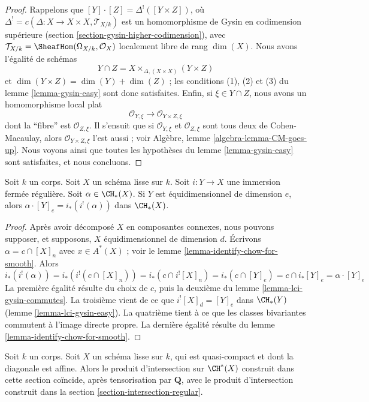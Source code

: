 \begin{proof}
Rappelons que $[Y] \cdot [Z] = \Delta^!([Y \times Z])$, où
$\Delta^! = c(\Delta : X \to X \times X, \mathcal{T}_{X/k})$
est un homomorphisme de Gysin en codimension supérieure
(section \ref{section-gysin-higher-codimension}), avec
$\mathcal{T}_{X/k} = \SheafHom(\Omega_{X/k}, \mathcal{O}_X)$
localement libre de rang $\dim(X)$. Nous avons l'égalité de schémas
$$
Y \cap Z = X \times_{\Delta, (X \times X)} (Y \times Z)
$$
et $\dim(Y \times Z) = \dim(Y) + \dim(Z)$ ; les conditions 
(1), (2) et (3) du lemme \ref{lemma-gysin-easy} sont donc satisfaites.
Enfin, si $\xi \in Y \cap Z$, nous avons un homomorphisme local
plat
$$
\mathcal{O}_{Y, \xi} \longrightarrow
\mathcal{O}_{Y \times Z, \xi}
$$
dont la ``fibre'' est $\mathcal{O}_{Z, \xi}$. Il s'ensuit que si
$\mathcal{O}_{Y, \xi}$ et $\mathcal{O}_{Z, \xi}$
sont tous deux de Cohen-Macaulay, alors $\mathcal{O}_{Y \times Z, \xi}$ l'est aussi ; voir
Algèbre, lemme \ref{algebra-lemma-CM-goes-up}.
Nous voyons ainsi que toutes les hypothèses du
lemme \ref{lemma-gysin-easy} sont satisfaites, et nous concluons.
\end{proof}

\begin{lemma}
\label{lemma-intersect-regularly-embedded}
Soit $k$ un corps. Soit $X$ un schéma lisse sur $k$. Soit $i : Y \to X$
une immersion fermée régulière. Soit $\alpha \in \CH_*(X)$. Si $Y$ est
équidimensionnel de dimension $e$, alors
$\alpha \cdot [Y]_e = i_*(i^!(\alpha))$ dans $\CH_*(X)$.
\end{lemma}

\begin{proof}
Après avoir décomposé $X$ en composantes connexes, nous pouvons supposer, et supposons, $X$
équidimensionnel de dimension $d$. Écrivons $\alpha = c \cap [X]_n$
avec $x \in A^*(X)$ ; voir le lemme \ref{lemma-identify-chow-for-smooth}. Alors
$$
i_*(i^!(\alpha)) = i_*(i^!(c \cap [X]_n)) =
i_*(c \cap i^![X]_n) = i_*(c \cap [Y]_e) =
c \cap i_*[Y]_e = \alpha \cdot [Y]_e
$$
La première égalité résulte du choix de $c$, puis la deuxième du
lemme \ref{lemma-lci-gysin-commutes}. La troisième vient de ce que
$i^![X]_d = [Y]_e$ dans $\CH_*(Y)$ (lemme \ref{lemma-lci-gysin-easy}).
La quatrième tient à ce que les classes bivariantes commutent à l'image directe propre.
La dernière égalité résulte du lemme \ref{lemma-identify-chow-for-smooth}.
\end{proof}

\begin{lemma}
\label{lemma-intersection-regular-smooth}
Soit $k$ un corps. Soit $X$ un schéma lisse sur $k$, qui est
quasi-compact et dont la diagonale est affine. Alors le produit
d'intersection sur $\CH^*(X)$ construit dans cette section coïncide,
après tensorisation par $\mathbf{Q}$, avec le produit d'intersection
construit dans la section \ref{section-intersection-regular}.
\end{lemma}

